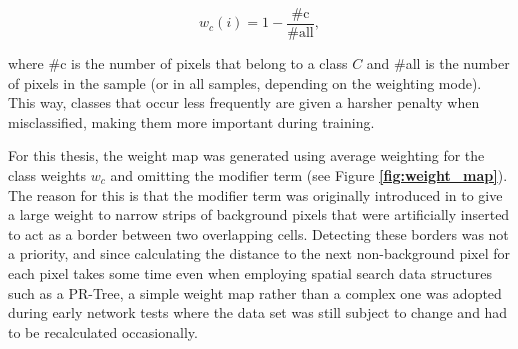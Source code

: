 \[ w_c(i) = 1 - \frac{\text{\#c}}{\text{\#all}}, \]

\noindent where \#c is the number of pixels that belong to a class $C$ and \#all is the number of pixels in the sample (or in all samples, depending on the weighting mode). This way, classes that occur less frequently are given a harsher penalty when misclassified, making them more important during training.

For this thesis, the weight map was generated using average weighting for the class weights $w_c$ and omitting the modifier term (see Figure \textbf{\ref{fig:weight_map}}). The reason for this is that the modifier term was originally introduced in \cite{unet} to give a large weight to narrow strips of background pixels that were artificially inserted to act as a border between two overlapping cells. Detecting these borders was not a priority, and since calculating the distance to the next non-background pixel for each pixel takes some time even when employing spatial search data structures such as a PR-Tree,  a simple weight map rather than a complex one was adopted during early network tests where the data set was still subject to change and had to be recalculated occasionally.\\

